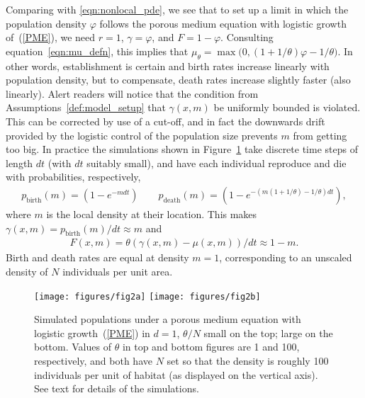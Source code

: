 \documentclass[EJP]{ejpecp} %
\begin{document}
Comparing %
with \eqref{eqn:nonlocal_pde},
we see that to set up a limit in which the population density $\varphi$ follows the 
porous medium equation with logistic growth of~(\ref{PME}),
we need $r=1$,
$\gamma = \varphi$, and $F = 1 - \varphi$.
Consulting equation~\eqref{eqn:mu_defn},
this implies that $\mu_\theta = \max\big(0, (1 + 1/\theta) \varphi - 1/\theta\big)$.
In other words,
establishment is certain
and birth rates increase linearly with population density,
but to compensate, death rates increase slightly faster (also linearly).
Alert readers will notice that
the condition from Assumptions~\ref{def:model_setup} 
that $\gamma(x,m)$ be uniformly bounded 
is violated.
This can be corrected by use of a cut-off, and in fact the downwards drift
provided by the logistic control of the population size prevents $m$ from 
getting too big. 
In practice the simulations shown in Figure~\ref{fig:pme_waves}
take discrete time steps of length $dt$ (with $dt$ suitably small),
and have each individual reproduce and die with probabilities, respectively,
\begin{align*}
    p_\text{birth}(m) = \left(1 - e^{- m dt}\right)
    \qquad 
    p_\text{death}(m) = \left(1 - e^{- (m (1+1/\theta) - 1/\theta) dt} \right) ,
\end{align*}
where $m$ is the local density at their location.
This makes $\gamma(x, m) = p_\text{birth}(m)/dt \approx m$
and
\begin{align*}
    F(x, m) = \theta(\gamma(x, m) - \mu(x, m)) / dt \approx 1 - m .
\end{align*}
Birth and death rates are equal at density $m = 1$,
corresponding to an unscaled density of $N$ individuals per unit area.

\begin{figure}
    \begin{center}
        \texttt{[image: figures/fig2a]}
        \texttt{[image: figures/fig2b]}
    \end{center}
    \caption{
        Simulated populations under a porous medium equation with logistic growth~(\ref{PME}) in $d=1$,
        $\theta/N$ small on the top; large on the bottom.
        Values of $\theta$ in top and bottom figures
        are 1 and 100, respectively, and both have $N$ set
        so that the density is roughly 100 individuals per unit of habitat
        (as displayed on the vertical axis).
        See text for details of the simulations.
        \label{fig:pme_waves}
    }
\end{figure}
\end{document}
